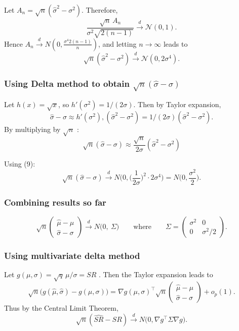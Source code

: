 \documentclass[
  12pt,
]{article}
\begin{document}
Let \(A_n=\sqrt{n}(\widehat\sigma^2-\sigma^2)\). Therefore, \[
\frac{\sqrt{n}\,A_n}{\sigma^2\sqrt{2(n-1)}} \xrightarrow{d} \mathcal{N}(0,1) \tag{8}.
\] Hence
\(A_n \xrightarrow{d} N\!\left(0,\frac{\sigma^4 2(n-1)}{n}\right)\), and
letting \(n\to\infty\) leads to \[
\sqrt{n}(\widehat\sigma^2-\sigma^2)\xrightarrow{d} \mathcal{N}(0,2\sigma^4) \tag{9}.
\]

\subsubsection{\texorpdfstring{Using Delta method to obtain
\(\sqrt{n}(\widehat\sigma-\sigma)\)}{Using Delta method to obtain \textbackslash sqrt\{n\}(\textbackslash widehat\textbackslash sigma-\textbackslash sigma)}}\label{using-delta-method-to-obtain-sqrtnwidehatsigma-sigma}

Let \(h(x)=\sqrt{x}\), so \(h'(\sigma^2)=1/(2\sigma)\). Then by Taylor
expansion, \[ 
\widehat\sigma-\sigma \approx h'(\sigma^2),(\widehat\sigma^2-\sigma^2)=1/(2\sigma)(\widehat\sigma^2-\sigma^2).
\] By multiplying by \(\sqrt{n}\) : \[ 
\sqrt{n}(\widehat\sigma-\sigma) \approx \frac{\sqrt{n}}{2\sigma}(\widehat\sigma^2-\sigma^2) 
\]

Using (9): \[
\sqrt{n}(\widehat\sigma-\sigma)\xrightarrow{d} N\!\Big(0,\Big(\frac{1}{2\sigma}\Big)^2\cdot 2\sigma^4\Big)=N\!\Big(0,\frac{\sigma^2}{2}\Big).
\]

\subsubsection{Combining results so far}\label{combining-results-so-far}

\[
\sqrt{n}\begin{pmatrix}\widehat\mu-\mu\\[4pt]\widehat\sigma-\sigma\end{pmatrix}
\xrightarrow{d} N\!\Big(0,\ \Sigma\Big)  \qquad\text{where}\qquad
\Sigma=\begin{pmatrix}\sigma^2 & 0\\[6pt]0 & \sigma^2/2\end{pmatrix}.
\]

\subsubsection{Using multivariate delta
method}\label{using-multivariate-delta-method}

Let \(g(\mu,\sigma)=\sqrt{q}\,\mu/\sigma = SR\) . Then the Taylor
expansion leads to \[
\sqrt{n}\big(g(\widehat\mu,\widehat\sigma)-g(\mu,\sigma)\big)
= \nabla g(\mu,\sigma)^\top \sqrt{n}\begin{pmatrix}\widehat\mu-\mu\\[4pt]\widehat\sigma-\sigma\end{pmatrix} + o_p(1).
\] Thus by the Central Limit Theorem, \[
\sqrt{n}(\widehat{SR}-SR)\xrightarrow{d} N\!\Big(0,\nabla g^\top\Sigma\nabla g\Big).
\]
\end{document}
